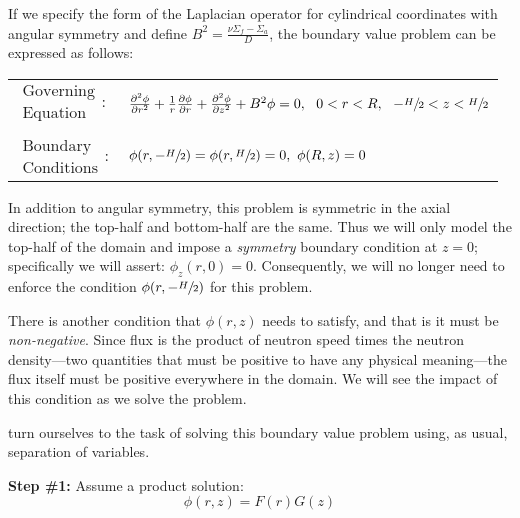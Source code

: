 If we specify the form of the Laplacian operator for cylindrical coordinates with angular symmetry and define $B^2 = \frac{\nu \Sigma_f - \Sigma_a}{D}$, the boundary value problem can be expressed as follows:
\begin{table}[h]
\begin{tabular}{l l}
$\substack{\text{Governing} \\\text{Equation}}: $& $\frac{\partial^2 \phi}{\partial r^2} + \frac{1}{r}\frac{\partial \phi}{\partial r} + \frac{\partial^2 \phi}{\partial z^2} + B^2\phi= 0, \ \ 0<r<R, \ \ -\sfrac{H}{2}<z<\sfrac{H}{2} $\\
& \\
$\substack{\text{Boundary} \\ \text{Conditions}}: $ & $\phi(r,-\sfrac{H}{2}) = \phi(r,\sfrac{H}{2}) = 0, \  \phi(R,z) = 0$  \\ 
\end{tabular}
\end{table} 


In addition to angular symmetry, this problem is symmetric in the axial direction; the top-half and bottom-half are the same.  Thus we will only model the top-half of the domain and impose a \emph{symmetry} boundary condition at $z=0$; specifically we will assert: $\phi_z(r,0) = 0$. Consequently, we will no longer need to enforce the condition $\phi(r,-\sfrac{H}{2})$ for this problem.  

There is another condition that $\phi(r,z)$ needs to satisfy, and that is it must be \emph{non-negative}.  Since flux is the product of neutron speed times the neutron density---two quantities that must be positive to have any physical meaning---the flux itself must be positive everywhere in the domain.  We will see the impact of this condition as we solve the problem.

 turn ourselves to the task of solving this boundary value problem using, as usual, separation of variables.

\vspace{0.25cm}

\noindent\textbf{Step \#1:} Assume a product solution:
\begin{equation*}
\phi(r,z) = F(r)G(z)
\end{equation*}

\vspace{0.25cm}

